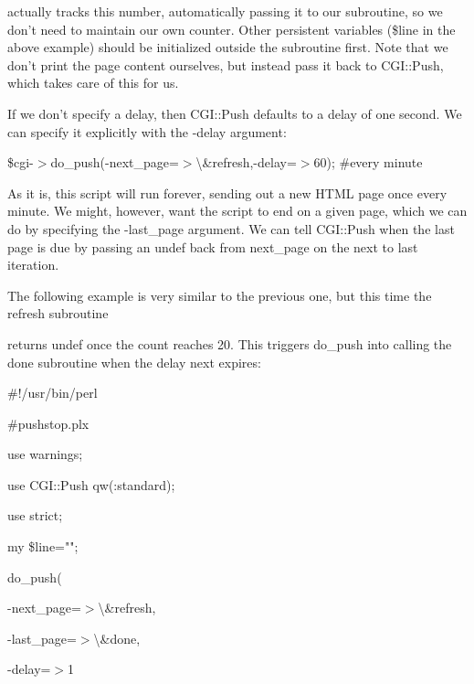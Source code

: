 \documentclass[a4paper,11pt]{book}
\begin{document}
\noindent actually tracks this number, automatically passing it to our subroutine, so we don't need to maintain our own counter. Other persistent variables (\$line in the above example) should be initialized outside the subroutine first. Note that we don't print the page content ourselves, but instead pass it back to CGI::Push, which takes care of this for us.

\noindent 

\noindent If we don't specify a delay, then CGI::Push defaults to a delay of one second. We can specify it explicitly with the -delay argument:

\noindent 

\noindent \$cgi-$>$do\_push(-next\_page=$>$\textbackslash \&refresh,-delay=$>$60); \#every minute

\noindent 

\noindent As it is, this script will run forever, sending out a new HTML page once every minute. We might, however, want the script to end on a given page, which we can do by specifying the -last\_page argument. We can tell CGI::Push when the last page is due by passing an undef back from next\_page on the next to last iteration.

\noindent 

\noindent 

\noindent The following example is very similar to the previous one, but this time the refresh subroutine

\noindent returns undef once the count reaches 20. This triggers do\_push into calling the done subroutine when the delay next expires:

\noindent 

\noindent 

\noindent \#!/usr/bin/perl

\noindent \#pushstop.plx

\noindent use warnings;

\noindent use CGI::Push qw(:standard);

\noindent use strict;

\noindent 

\noindent my \$line="";

\noindent 

\noindent do\_push(

\noindent -next\_page=$>$\textbackslash \&refresh,

\noindent -last\_page=$>$\textbackslash \&done,

\noindent -delay=$>$1
\end{document}

